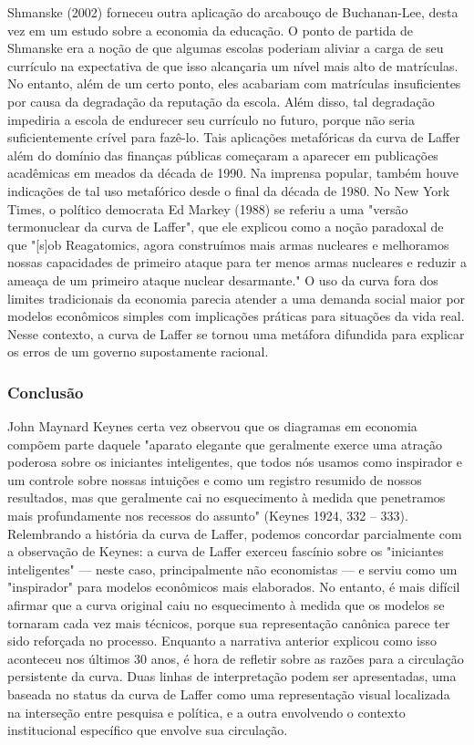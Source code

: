 \documentclass[a4paper,12pt]{article}[abntex2]
\begin{document}
Shmanske (2002) forneceu outra aplicação do arcabouço de Buchanan-Lee, desta vez em um estudo sobre a economia da educação. O ponto de partida de Shmanske era a noção de que algumas escolas poderiam aliviar a carga de seu currículo na expectativa de que isso alcançaria um nível mais alto de matrículas. No entanto, além de um certo ponto, eles acabariam com matrículas insuficientes por causa da degradação da reputação da escola. Além disso, tal degradação impediria a escola de endurecer seu currículo no futuro, porque não seria suficientemente crível para fazê-lo. Tais aplicações metafóricas da curva de Laffer além do domínio das finanças públicas começaram a aparecer em publicações acadêmicas em meados da década de 1990. Na imprensa popular, também houve indicações de tal uso metafórico desde o final da década de 1980. No New York Times, o político democrata Ed Markey (1988) se referiu a uma "versão termonuclear da curva de Laffer", que ele explicou como a noção paradoxal de que "[s]ob Reagatomics, agora construímos mais armas nucleares e melhoramos nossas capacidades de primeiro ataque para ter menos armas nucleares e reduzir a ameaça de um primeiro ataque nuclear desarmante." O uso da curva fora dos limites tradicionais da economia parecia atender a uma demanda social maior por modelos econômicos simples com implicações práticas para situações da vida real. Nesse contexto, a curva de Laffer se tornou uma metáfora difundida para explicar os erros de um governo supostamente racional.

\subsubsection{\textbf{Conclusão}}
John Maynard Keynes certa vez observou que os diagramas em economia compõem parte daquele "aparato elegante que geralmente exerce uma atração poderosa sobre os iniciantes inteligentes, que todos nós usamos como inspirador e um controle sobre nossas intuições e como um registro resumido de nossos resultados, mas que geralmente cai no esquecimento à medida que penetramos mais profundamente nos recessos do assunto" (Keynes 1924, 332 – 333). Relembrando a história da curva de Laffer, podemos concordar parcialmente com a observação de Keynes: a curva de Laffer exerceu fascínio sobre os "iniciantes inteligentes" — neste caso, principalmente não economistas — e serviu como um "inspirador" para modelos econômicos mais elaborados. No entanto, é mais difícil afirmar que a curva original caiu no esquecimento à medida que os modelos se tornaram cada vez mais técnicos, porque sua representação canônica parece ter sido reforçada no processo. Enquanto a narrativa anterior explicou como isso aconteceu nos últimos 30 anos, é hora de refletir sobre as razões para a circulação persistente da curva. Duas linhas de interpretação podem ser apresentadas, uma baseada no status da curva de Laffer como uma representação visual localizada na interseção entre pesquisa e política, e a outra envolvendo o contexto institucional específico que envolve sua circulação.
\end{document}
